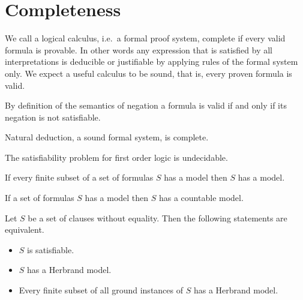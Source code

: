 

\chapter{Completeness}

\begin{definition}
	We call a logical calculus, i.e.~a formal proof system, {\myem complete} if every valid formula is provable.
	In other words any expression that is satisfied by all interpretations 
	is deducible or justifiable by applying rules of the formal system only.
	We expect a useful calculus to be {\myem sound}, that is, every proven formula is valid.
\end{definition}

\begin{lemma}[Refutation]
	By definition of the semantics of negation a formula is valid if and only if its negation is not satisfiable.
\end{lemma}

\begin{theorem}
	Natural deduction, a sound formal system, is complete.
\end{theorem}

\begin{theorem}
	The satisfiability problem for first order logic is undecidable.
\end{theorem}










\begin{theorem}[Compactness]\label{the:compactness}
	If every finite subset of a set of formulas $S$ has a model then $S$ has a model. 
\end{theorem}

\begin{theorem}\label{the:loewenheim}
	If a set of formulas $S$ has a model then $S$ has a countable model.
\end{theorem}

\begin{theorem}[Herbrand]\label{the:herbrand}
	Let $S$ be a set of clauses without equality. Then the following statements are equivalent.
	\begin{itemize}
		\item $S$ is satisfiable.
		\item $S$ has a Herbrand model.
		\item Every finite subset of all ground instances of $S$ has a Herbrand model.
	\end{itemize} 
\end{theorem}

